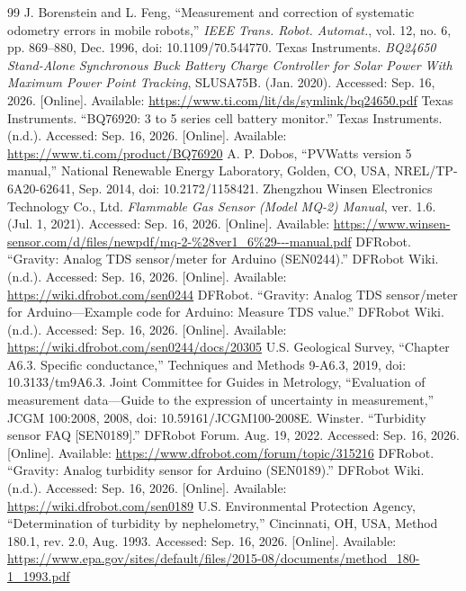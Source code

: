 \begin{thebibliography}{99}
J. Borenstein and L. Feng, ``Measurement and correction of systematic odometry errors in mobile robots,'' \textit{IEEE Trans. Robot. Automat.}, vol. 12, no. 6, pp. 869--880, Dec. 1996, doi: 10.1109/70.544770.
Texas Instruments. \textit{BQ24650 Stand-Alone Synchronous Buck Battery Charge Controller for Solar Power With Maximum Power Point Tracking}, SLUSA75B. (Jan. 2020). Accessed: Sep. 16, 2026. [Online]. Available: \url{https://www.ti.com/lit/ds/symlink/bq24650.pdf}
Texas Instruments. ``BQ76920: 3 to 5 series cell battery monitor.'' Texas Instruments. (n.d.). Accessed: Sep. 16, 2026. [Online]. Available: \url{https://www.ti.com/product/BQ76920}
A. P. Dobos, ``PVWatts version 5 manual,'' National Renewable Energy Laboratory, Golden, CO, USA, NREL/TP-6A20-62641, Sep. 2014, doi: 10.2172/1158421.
Zhengzhou Winsen Electronics Technology Co., Ltd. \textit{Flammable Gas Sensor (Model MQ-2) Manual}, ver. 1.6. (Jul. 1, 2021). Accessed: Sep. 16, 2026. [Online]. Available: \url{https://www.winsen-sensor.com/d/files/newpdf/mq-2-\%28ver1_6\%29---manual.pdf}
DFRobot. ``Gravity: Analog TDS sensor/meter for Arduino (SEN0244).'' DFRobot Wiki. (n.d.). Accessed: Sep. 16, 2026. [Online]. Available: \url{https://wiki.dfrobot.com/sen0244}
DFRobot. ``Gravity: Analog TDS sensor/meter for Arduino---Example code for Arduino: Measure TDS value.'' DFRobot Wiki. (n.d.). Accessed: Sep. 16, 2026. [Online]. Available: \url{https://wiki.dfrobot.com/sen0244/docs/20305}
U.S. Geological Survey, ``Chapter A6.3. Specific conductance,'' Techniques and Methods 9-A6.3, 2019, doi: 10.3133/tm9A6.3.
Joint Committee for Guides in Metrology, ``Evaluation of measurement data---Guide to the expression of uncertainty in measurement,'' JCGM 100:2008, 2008, doi: 10.59161/JCGM100-2008E.
Winster. ``Turbidity sensor FAQ [SEN0189].'' DFRobot Forum. Aug. 19, 2022. Accessed: Sep. 16, 2026. [Online]. Available: \url{https://www.dfrobot.com/forum/topic/315216}
DFRobot. ``Gravity: Analog turbidity sensor for Arduino (SEN0189).'' DFRobot Wiki. (n.d.). Accessed: Sep. 16, 2026. [Online]. Available: \url{https://wiki.dfrobot.com/sen0189}
U.S. Environmental Protection Agency, ``Determination of turbidity by nephelometry,'' Cincinnati, OH, USA, Method 180.1, rev. 2.0, Aug. 1993. Accessed: Sep. 16, 2026. [Online]. Available: \url{https://www.epa.gov/sites/default/files/2015-08/documents/method_180-1_1993.pdf}

\end{thebibliography}
